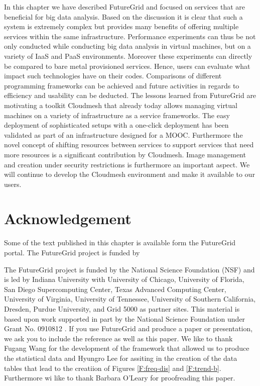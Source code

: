 \documentclass{article}
\begin{document}
{In this chapter we have described FutureGrid and focused on services that are beneficial for big data analysis. Based on the discussion it is clear that such a system is extremely complex but provides many benefits of offering multiple services within the same infrastructure. Performance experiments can thus be not only conducted while conducting big data analysis in virtual machines, but on a variety of IaaS and PaaS environments. Moreover these experiments can directly be compared to bare metal provisioned services. Hence, users can evaluate what impact such technologies have on their codes. Comparisons of different programming frameworks can be achieved and future activities in regards to efficiency and usability can be deducted. The lessons learned from FutureGrid are motivating a toolkit Cloudmesh that already today allows managing virtual machines on a variety of infrastructure as a service frameworks. The easy deployment of sophisticated setups with a one-click deployment has been validated as part of an infrastructure designed for a MOOC. Furthermore the novel concept of shifting resources \cite{las08federated-cloud} between services to support services that need more resources is a significant contribution by Cloudmesh. Image management and creation under security restrictions \cite{fg-1295} is furthermore an important aspect. We will continue to develop the Cloudmesh environment and make it available to our users.




\section*{Acknowledgement}


Some of the text published in this chapter is available form the FutureGrid portal. The FutureGrid project is funded by 

The FutureGrid project is funded by the National Science Foundation (NSF) and is led by Indiana University with University of Chicago, University of Florida, San Diego Supercomputing Center, Texas Advanced Computing Center, University of Virginia, University of Tennessee, University of Southern California, Dresden, Purdue University, and Grid 5000 as partner sites. This material is based upon work supported in part by the National Science Foundation under Grant No. 0910812 \cite{las12fg-bookchapter}. If you use FutureGrid and produce a paper or presentation, we ask you to include the reference \cite{las2010gce,las12fg-bookchapter} as well as this paper. 
We like to thank Fugang Wang for the development of the framework that allowed us to produce the statistical data and  Hyungro Lee for assiting in the creation of the data tables that lead to the creatiion of Figures \ref{F:freq-dis} and \ref{F:trend-b}. Furthermore wi like to thank Barbara O'Leary for proofreading this paper.

}
\end{document}
